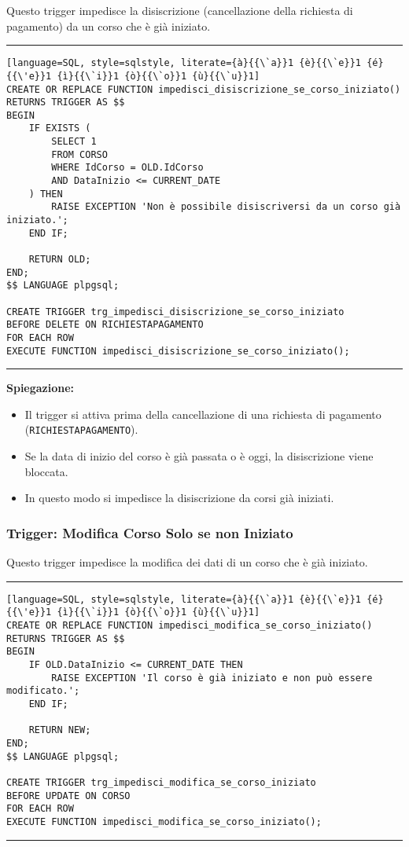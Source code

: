 Questo trigger impedisce la disiscrizione (cancellazione della richiesta di pagamento) da un corso che è già iniziato.

\noindent\rule{\textwidth}{0.4pt}
\begin{lstlisting}[language=SQL, style=sqlstyle, literate={à}{{\`a}}1 {è}{{\`e}}1 {é}{{\'e}}1 {ì}{{\`i}}1 {ò}{{\`o}}1 {ù}{{\`u}}1]
CREATE OR REPLACE FUNCTION impedisci_disiscrizione_se_corso_iniziato()
RETURNS TRIGGER AS $$
BEGIN
    IF EXISTS (
        SELECT 1
        FROM CORSO
        WHERE IdCorso = OLD.IdCorso
        AND DataInizio <= CURRENT_DATE
    ) THEN
        RAISE EXCEPTION 'Non è possibile disiscriversi da un corso già iniziato.';
    END IF;

    RETURN OLD;
END;
$$ LANGUAGE plpgsql;

CREATE TRIGGER trg_impedisci_disiscrizione_se_corso_iniziato
BEFORE DELETE ON RICHIESTAPAGAMENTO
FOR EACH ROW
EXECUTE FUNCTION impedisci_disiscrizione_se_corso_iniziato();
\end{lstlisting}
\noindent\rule{\textwidth}{0.4pt}

\textbf{Spiegazione:}
\begin{itemize}
        \item Il trigger si attiva prima della cancellazione di una richiesta di pagamento (\texttt{RICHIESTAPAGAMENTO}).
        \item Se la data di inizio del corso è già passata o è oggi, la disiscrizione viene bloccata.
        \item In questo modo si impedisce la disiscrizione da corsi già iniziati.
\end{itemize}

\subsubsection{Trigger: Modifica Corso Solo se non Iniziato}

Questo trigger impedisce la modifica dei dati di un corso che è già iniziato.

\noindent\rule{\textwidth}{0.4pt}
\begin{lstlisting}[language=SQL, style=sqlstyle, literate={à}{{\`a}}1 {è}{{\`e}}1 {é}{{\'e}}1 {ì}{{\`i}}1 {ò}{{\`o}}1 {ù}{{\`u}}1]
CREATE OR REPLACE FUNCTION impedisci_modifica_se_corso_iniziato()
RETURNS TRIGGER AS $$
BEGIN
    IF OLD.DataInizio <= CURRENT_DATE THEN
        RAISE EXCEPTION 'Il corso è già iniziato e non può essere modificato.';
    END IF;

    RETURN NEW;
END;
$$ LANGUAGE plpgsql;

CREATE TRIGGER trg_impedisci_modifica_se_corso_iniziato
BEFORE UPDATE ON CORSO
FOR EACH ROW
EXECUTE FUNCTION impedisci_modifica_se_corso_iniziato();
\end{lstlisting}
\noindent\rule{\textwidth}{0.4pt}


